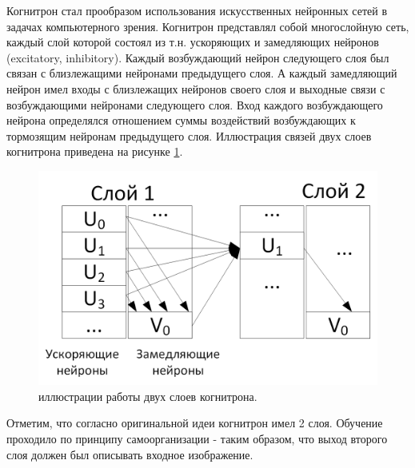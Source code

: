 \documentclass[12pt]{article}
\begin{document}
\begin{sloppypar}
Когнитрон стал прообразом использования искусственных нейронных сетей в задачах компьютерного зрения. Когнитрон представлял собой многослойную сеть, каждый слой которой состоял из т.н. ускоряющих и замедляющих нейронов (excitatory, inhibitory). Каждый возбуждающий нейрон следующего слоя был связан с близлежащими нейронами предыдущего слоя. А каждый замедляющий нейрон имел входы с близлежащих нейронов своего слоя и выходные связи с возбуждающими нейронами следующего слоя. Вход каждого возбуждающего нейрона определялся отношением суммы воздействий возбуждающих к тормозящим нейронам предыдущего слоя. Иллюстрация связей двух слоев когнитрона приведена на рисунке \ref{ch1:fig:cognitron}.

    \begin{figure} [!h]
    	\begin{center}
    		\includegraphics[width=0.5\linewidth]{./figuresch1/cognitron.png}
    		\caption{иллюстрации работы двух слоев когнитрона.}		
    		\label{ch1:fig:cognitron}
    	\end{center}
    \end{figure}

Отметим, что согласно оригинальной идеи когнитрон имел 2 слоя. Обучение проходило по принципу самоорганизации - таким образом, что выход второго слоя должен был описывать входное изображение. 


\end{sloppypar}
\end{document}
